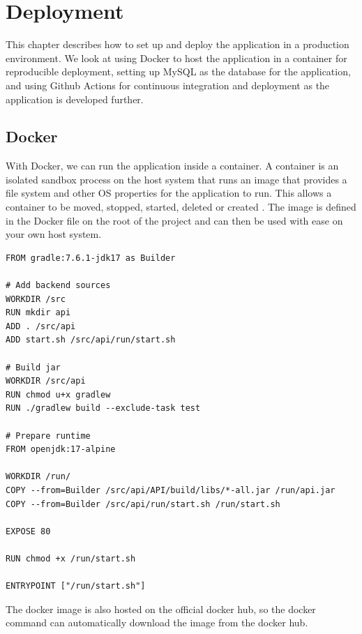 \chapter{Deployment}

\label{chap:deployment}

This chapter describes how to set up and deploy the application in a production environment. We look at using Docker to host the application in a container for reproducible deployment, setting up MySQL as the database for the application, and using Github Actions for continuous integration and deployment as the application is developed further.

\section{Docker}

\label{sec:docker}

With Docker, we can run the application inside a container. A container is an isolated sandbox process on the host system that runs an image that provides a file system and other OS properties for the application to run. This allows a container to be moved, stopped, started, deleted or created \cite{docker}. The image is defined in the Docker file on the root of the project and can then be used with ease on your own host system. 

\begin{verbatim}
FROM gradle:7.6.1-jdk17 as Builder

# Add backend sources
WORKDIR /src
RUN mkdir api
ADD . /src/api
ADD start.sh /src/api/run/start.sh

# Build jar
WORKDIR /src/api
RUN chmod u+x gradlew
RUN ./gradlew build --exclude-task test

# Prepare runtime
FROM openjdk:17-alpine

WORKDIR /run/
COPY --from=Builder /src/api/API/build/libs/*-all.jar /run/api.jar
COPY --from=Builder /src/api/run/start.sh /run/start.sh

EXPOSE 80

RUN chmod +x /run/start.sh

ENTRYPOINT ["/run/start.sh"]
\end{verbatim}

The docker image is also hosted on the official docker hub, so the docker command can automatically download the image from the docker hub. 

